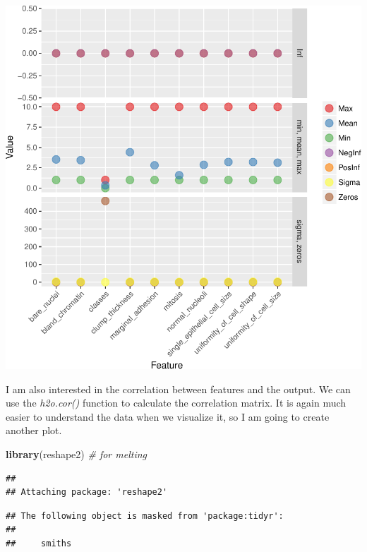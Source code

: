 \documentclass[]{article}
\newenvironment{Shaded}{\begin{snugshade}}{\end{snugshade}}
\newcommand{\KeywordTok}[1]{\textcolor[rgb]{0.13,0.29,0.53}{\textbf{{#1}}}}
\newcommand{\CommentTok}[1]{\textcolor[rgb]{0.56,0.35,0.01}{\textit{{#1}}}}
\newcommand{\NormalTok}[1]{{#1}}
\begin{document}
\begin{center}\includegraphics{webinar_code_files/figure-latex/h2o_describe-1} \end{center}

I am also interested in the correlation between features and the output.
We can use the \emph{h2o.cor()} function to calculate the correlation
matrix. It is again much easier to understand the data when we visualize
it, so I am going to create another plot.

\begin{Shaded}
\begin{Highlighting}[]
\KeywordTok{library}\NormalTok{(reshape2) }\CommentTok{# for melting}
\end{Highlighting}
\end{Shaded}

\begin{verbatim}
## 
## Attaching package: 'reshape2'
\end{verbatim}

\begin{verbatim}
## The following object is masked from 'package:tidyr':
## 
##     smiths
\end{verbatim}
\end{document}
